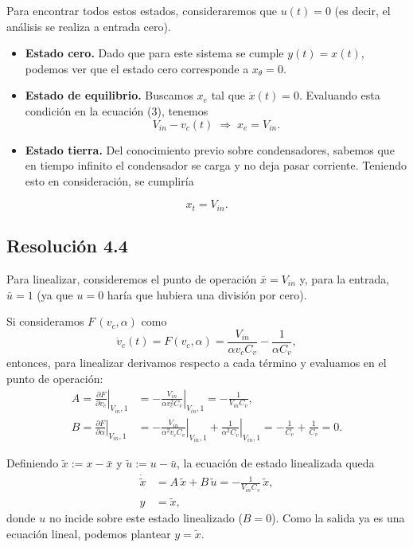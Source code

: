 \documentclass[
  11pt,
  letterpaper,
   addpoints,
  answers
  ]{exam}
\begin{document}
\begin{questions}
\begin{solution}
Para encontrar todos estos estados, consideraremos que $u(t)=0$ (es decir, el análisis se realiza a entrada cero).
\begin{itemize}
  \item  \textbf{Estado cero.} Dado que para este sistema se cumple $y(t)=x(t)$, podemos ver que el estado cero corresponde a $\boxed{x_{\theta}=0}$.

\item \textbf{Estado de equilibrio.} Buscamos $x_e$ tal que $\dot{x}(t)=0$. Evaluando esta condición en la ecuación (3), tenemos
\begin{equation}
V_{in}-v_c(t)\;\Rightarrow\; \boxed{x_e=V_{in}}.
\end{equation}

\item \textbf{Estado tierra.} Del conocimiento previo sobre condensadores, sabemos que en tiempo infinito el condensador se carga y no deja pasar corriente. Teniendo esto en consideración, se cumpliría
\end{itemize}
\begin{equation}
\boxed{x_t=V_{in}}.
\end{equation}

\subsection*{Resolución 4.4}

Para linealizar, consideremos el punto de operación $\bar{x}=V_{in}$ y, para la entrada, $\bar{u}=1$ (ya que $u=0$ haría que hubiera una división por cero).

Si consideramos $F\,(v_c,\alpha)$ como
\begin{equation}
\dot{v}_c(t)=F(v_c,\alpha)=\frac{V_{in}}{\alpha v_c C_v}-\frac{1}{\alpha C_v},
\end{equation}
entonces, para linealizar derivamos respecto a cada término y evaluamos en el punto de operación:
\begin{align}
A
=\left.\frac{\partial F}{\partial v_c}\right|_{V_{in},1}
&=-\left.\frac{V_{in}}{\alpha v_c^{2} C_v}\right|_{V_{in},1}
=-\frac{1}{V_{in} C_v},\\[4pt]
B
=\left.\frac{\partial F}{\partial \alpha}\right|_{V_{in},1}
&=-\left.\frac{V_{in}}{\alpha^{2} v_c C_v}\right|_{V_{in},1}
+\left.\frac{1}{\alpha^{2} C_v}\right|_{V_{in},1}
=-\frac{1}{C_v}+\frac{1}{C_v}=0.
\end{align}

Definiendo $\tilde{x}:=x-\bar{x}$ y $\tilde{u}:=u-\bar{u}$, la ecuación de estado linealizada queda
\begin{align}
\dot{\tilde{x}}&=A\,\tilde{x}+B\,\tilde{u}=-\frac{1}{V_{in}C_v}\,\tilde{x},\\
y&=\tilde{x},
\end{align}
donde $u$ no incide sobre este estado linealizado ($B=0$). Como la salida ya es una ecuación lineal, podemos plantear $y=\tilde{x}$.


\end{solution}
\end{questions}
\end{document}
